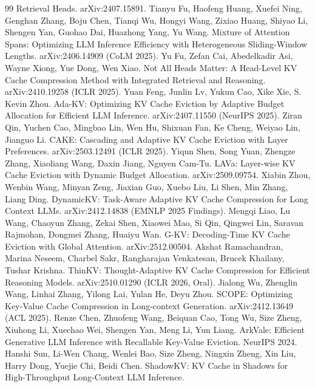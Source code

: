 \documentclass{article}
\begin{document}
\begin{thebibliography}{99}
    Retrieval Heads. arXiv:2407.15891.
    Tianyu Fu, Haofeng Huang, Xuefei Ning, Genghan Zhang, Boju Chen,
    Tianqi Wu, Hongyi Wang, Zixiao Huang, Shiyao Li, Shengen Yan, Guohao
    Dai, Huazhong Yang, Yu Wang. Mixture of Attention Spans: Optimizing
    LLM Inference Efficiency with Heterogeneous Sliding-Window Lengths.
    arXiv:2406.14909 (CoLM 2025).
    Yu Fu, Zefan Cai, Abedelkadir Asi, Wayne Xiong, Yue Dong, Wen Xiao.
    Not All Heads Matter: A Head-Level KV Cache Compression Method with
    Integrated Retrieval and Reasoning. arXiv:2410.19258 (ICLR 2025).
    Yuan Feng, Junlin Lv, Yukun Cao, Xike Xie, S. Kevin Zhou. Ada-KV:
    Optimizing KV Cache Eviction by Adaptive Budget Allocation for
    Efficient LLM Inference. arXiv:2407.11550 (NeurIPS 2025).
    Ziran Qin, Yuchen Cao, Mingbao Lin, Wen Hu, Shixuan Fan, Ke Cheng,
    Weiyao Lin, Jianguo Li. CAKE: Cascading and Adaptive KV Cache
    Eviction with Layer Preferences. arXiv:2503.12491 (ICLR 2025).
    Yiqun Shen, Song Yuan, Zhengze Zhang, Xiaoliang Wang, Daxin Jiang,
    Nguyen Cam-Tu. LAVa: Layer-wise KV Cache Eviction with Dynamic
    Budget Allocation. arXiv:2509.09754.
    Xiabin Zhou, Wenbin Wang, Minyan Zeng, Jiaxian Guo, Xuebo Liu, Li
    Shen, Min Zhang, Liang Ding. DynamicKV: Task-Aware Adaptive KV Cache
    Compression for Long Context LLMs. arXiv:2412.14838 (EMNLP 2025
    Findings).
    Mengqi Liao, Lu Wang, Chaoyun Zhang, Zekai Shen, Xiaowei Mao, Si
    Qin, Qingwei Lin, Saravan Rajmohan, Dongmei Zhang, Huaiyu Wan. G-KV:
    Decoding-Time KV Cache Eviction with Global Attention.
    arXiv:2512.00504.
    Akshat Ramachandran, Marina Neseem, Charbel Sakr, Rangharajan
    Venkatesan, Brucek Khailany, Tushar Krishna. ThinKV: Thought-Adaptive
    KV Cache Compression for Efficient Reasoning Models. arXiv:2510.01290
    (ICLR 2026, Oral).
    Jialong Wu, Zhenglin Wang, Linhai Zhang, Yilong Lai, Yulan He, Deyu
    Zhou. SCOPE: Optimizing Key-Value Cache Compression in Long-context
    Generation. arXiv:2412.13649 (ACL 2025).
    Renze Chen, Zhuofeng Wang, Beiquan Cao, Tong Wu, Size Zheng, Xiuhong
    Li, Xuechao Wei, Shengen Yan, Meng Li, Yun Liang. ArkVale: Efficient
    Generative LLM Inference with Recallable Key-Value Eviction. NeurIPS
    2024.
    Hanshi Sun, Li-Wen Chang, Wenlei Bao, Size Zheng, Ningxin Zheng, Xin
    Liu, Harry Dong, Yuejie Chi, Beidi Chen. ShadowKV: KV Cache in
    Shadows for High-Throughput Long-Context LLM Inference.

\end{thebibliography}
\end{document}
